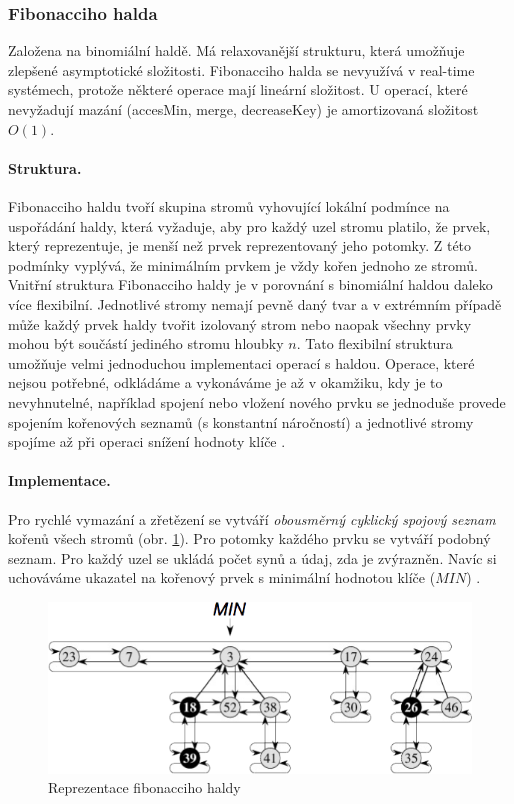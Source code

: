 \subsubsection{Fibonacciho halda}
Založena na binomiální haldě. Má relaxovanější strukturu, která umožňuje zlepšené asymptotické složitosti. Fibonacciho halda se nevyužívá v real-time systémech, protože některé operace mají lineární složitost. U operací, které nevyžadují mazání (accesMin, merge, decreaseKey) je amortizovaná složitost $O(1)$.

\paragraph{Struktura.} Fibonacciho haldu tvoří skupina stromů vyhovující lokální podmínce na uspořádání haldy, která vyžaduje, aby pro každý uzel stromu platilo, že prvek, který reprezentuje, je menší než prvek reprezentovaný jeho potomky. Z této podmínky vyplývá, že minimálním prvkem je vždy kořen jednoho ze stromů. Vnitřní struktura Fibonacciho haldy je v porovnání s binomiální haldou daleko více flexibilní. Jednotlivé stromy nemají pevně daný tvar a v extrémním případě může každý prvek haldy tvořit izolovaný strom nebo naopak všechny prvky mohou být součástí jediného stromu hloubky $n$. Tato flexibilní struktura umožňuje velmi jednoduchou implementaci operací s haldou. Operace, které nejsou potřebné, odkládáme a vykonáváme je až v okamžiku, kdy je to nevyhnutelné, například spojení nebo vložení nového prvku se jednoduše provede spojením kořenových seznamů (s konstantní náročností) a jednotlivé stromy spojíme až při operaci snížení hodnoty klíče \cite{wiki:fibonacci}.

\paragraph{Implementace.} Pro rychlé vymazání a zřetězení se vytváří \textit{obousměrný cyklický spojový seznam} kořenů všech stromů (obr. \ref{fig:fibonacci_heap}). Pro potomky každého prvku se vytváří podobný seznam. Pro každý uzel se ukládá počet synů a údaj, zda je zvýrazněn. Navíc si uchováváme ukazatel na kořenový prvek s minimální hodnotou klíče ($MIN$) \cite{wiki:fibonacci}.

\begin{figure}[htbp]
    \begin{center}
        \includegraphics[width=140mm]{spolecne/01/images/fibonacci_heap}
        \caption{Reprezentace fibonacciho haldy}
        \label{fig:fibonacci_heap}
    \end{center}
\end{figure}

